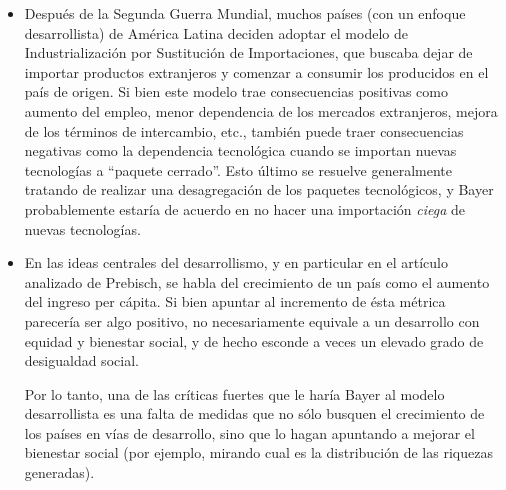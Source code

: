  \begin{itemize}
     \item Después de la Segunda Guerra Mundial, muchos países (con un enfoque desarrollista) de América Latina deciden adoptar el modelo de Industrialización por Sustitución de Importaciones, que buscaba dejar de importar productos extranjeros y comenzar a consumir los producidos en el país de origen. Si bien este modelo trae consecuencias positivas como aumento del empleo, menor dependencia de los mercados extranjeros, mejora de los términos de intercambio, etc., también puede traer consecuencias negativas como la dependencia tecnológica cuando se importan nuevas tecnologías a ``paquete cerrado''.
        Esto último se resuelve generalmente tratando de realizar una desagregación de los paquetes tecnológicos, y Bayer probablemente estaría de acuerdo en no hacer una importación \textit{ciega} de nuevas tecnologías.

     \item En las ideas centrales del desarrollismo, y en particular en el artículo analizado de Prebisch, se habla del crecimiento de un país como el aumento del ingreso per cápita. Si bien apuntar al incremento de ésta métrica parecería ser algo positivo, no necesariamente equivale a un desarrollo con equidad y bienestar social, y de hecho esconde a veces un elevado grado de desigualdad social.

        Por lo tanto, una de las críticas fuertes que le haría Bayer al modelo desarrollista es una falta de medidas que no sólo busquen el crecimiento de los países en vías de desarrollo, sino que lo hagan apuntando a mejorar el bienestar social (por ejemplo, mirando cual es la distribución de las riquezas generadas).
 \end{itemize}
